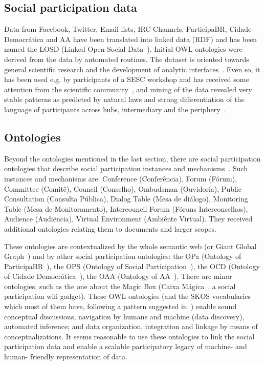 \documentclass[letterpaper,10pt]{article}
\begin{document}
\subsection{Social participation data}\label{losd}
Data from Facebook, Twitter, Email lists, IRC Channels, ParticipaBR,
Cidade Democrática and AA have been translated into linked data (RDF)
and has been named the LOSD (Linked Open Social Data~\cite{losd}).
Initial OWL ontologies were derived from the data by automated routines.
The dataset is oriented towards general scientific research
and the development of analytic interfaces~\cite{p1,p2,p3,p4,p5}.
Even so, it has been used e.g. by participants of a SESC workshop
and has received some attention from the scientific community~\cite{drones,tese},
and mining of the data revealed very stable patterns as predicted by natural laws
and strong differentiation of the language of participants across hubs,
intermediary and the periphery~\cite{stab,tese}. 

\subsection{Ontologies}\label{ont}
Beyond the ontologies mentioned in the last section,
there are social participation ontologies that describe
social participation instances and mechanisms~\cite{p5}.
Such instances and mechanisms are:
Conference (Conferência), Forum (Fórum),
Committee (Comitê), Council (Conselho), Ombudsman (Ouvidoria),
Public Consultation (Consulta Pública), Dialog Table (Mesa de diálogo),
Monitoring Table (Mesa de Monitoramento), Intercouncil Forum (Fóruns Interconselhos),
Audience (Audiëncia),
Virtual Environment (Ambiênte Virtual).
They received additional ontologies relating them to documents and
larger scopes.

These ontologies are contextualized by the whole semantic web
(or Giant Global Graph~\cite{losd})
and by other social participation ontologies:
the OPa (Ontology of ParticipaBR~\cite{p5}), the OPS (Ontology of Social Participation~\cite{ops}),
the OCD (Ontology of Cidade Democrática~\cite{p5}), the OAA (Ontology of AA~\cite{p5}).
There are minor ontologies, such as the one about the Magic Box (Caixa Mágica~\cite{cm},
a social participation wifi gadget).
These OWL ontologies (and the SKOS vocabularies which most of them have, following
a pattern suggested in~\cite{ont}) enable
sound conceptual discussions, navigation by humans and machine (data discovery),
 automated inference; and data organization, integration and linkage by means of conceptualizations.
It seems reasonable to use these ontologies to link the social participation data
and enable a scalable participatory legacy of machine- and human- friendly representation
of data.
\end{document}
